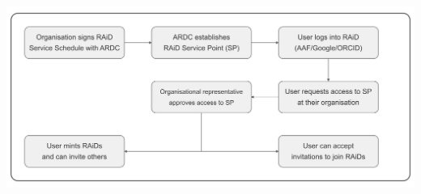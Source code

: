 \documentclass[a0,portrait]{a0poster}
\newenvironment{Figure}
  {\par\medskip\noindent\minipage{\linewidth}}
  {\endminipage\par\medskip}
\begin{document}
\begin{multicols}{3}
{%

% 


\begin{Figure}
 \centering
 \includegraphics[width=0.9\linewidth]{figures/raid-workflow-anz.png}
 \label{raid-workflow}
\end{Figure}

}
\end{multicols}
\end{document}
